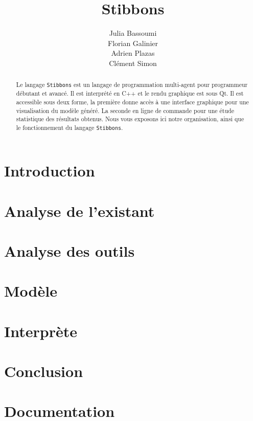 \documentclass[a4paper,11pt]{report}
\title{Stibbons}
\author{Julia Bassoumi\\Florian Galinier\\Adrien Plazas\\Clément Simon}
\begin{document}
\maketitle
\tableofcontents

\begin{abstract}
Le langage \verb|Stibbons| est un langage de programmation multi-agent pour programmeur débutant et avancé. Il est interprété en C++ et le rendu graphique est sous Qt. Il est accessible sous deux forme, la première donne accès à une interface graphique pour une visualisation du modèle généré. La seconde en ligne de commande pour une étude statistique des résultats obtenus.
Nous vous exposons ici notre organisation, ainsi que le fonctionnement du langage \verb|Stibbons|.
\end{abstract}

\chapter{Introduction}


\chapter{Analyse de l'existant}




\chapter{Analyse des outils}







\chapter{Modèle}


\chapter{Interprète}


\chapter{Conclusion}

\appendix

\chapter{Documentation}
\end{document}
